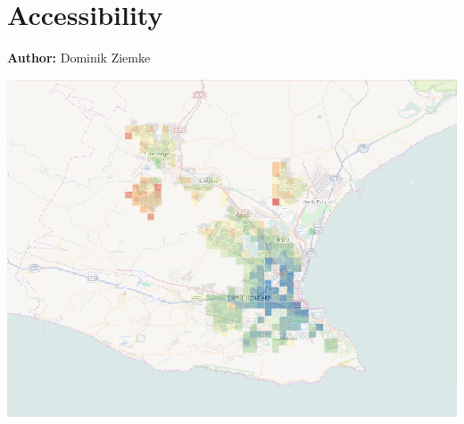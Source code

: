 \chapter{Accessibility}
\label{ch:accessibility}

\hfill \textbf{Author:} Dominik Ziemke

\begin{center} \includegraphics[width=1.\textwidth, angle=0]{extending/figures/accessibility/w_freeSpeed_snapshot.png} \end{center}



